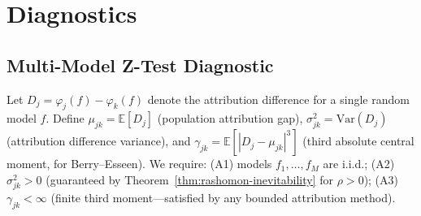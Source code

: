 \documentclass{article}
\newcommand{\E}{\mathbb{E}}
\newcommand{\Var}{\mathrm{Var}}
\begin{document}

\section{Diagnostics}
\label{sec:diagnostics}

\subsection{Multi-Model Z-Test Diagnostic}
\label{sec:f1}

Let $D_j = \varphi_j(f) - \varphi_k(f)$ denote the attribution difference for a single random model $f$. Define $\mu_{jk} = \E[D_j]$ (population attribution gap), $\sigma_{jk}^2 = \Var(D_j)$ (attribution difference variance), and $\gamma_{jk} = \E[|D_j - \mu_{jk}|^3]$ (third absolute central moment, for Berry--Esseen). We require: (A1) models $f_1, \ldots, f_M$ are i.i.d.; (A2) $\sigma_{jk}^2 > 0$ (guaranteed by Theorem~\ref{thm:rashomon-inevitability} for $\rho > 0$); (A3) $\gamma_{jk} < \infty$ (finite third moment---satisfied by any bounded attribution method).
\end{document}
